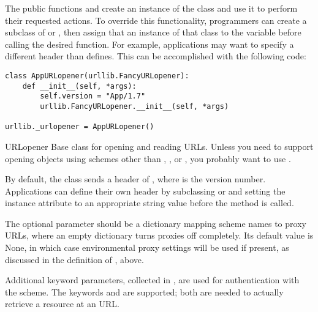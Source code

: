 The public functions  and
 create an instance of the
 class and use it to perform their requested
actions.  To override this functionality, programmers can create a
subclass of  or , then assign
that an instance of that class to the
 variable before calling the desired function.
For example, applications may want to specify a different
 header than  defines.  This
can be accomplished with the following code:

\begin{verbatim}
class AppURLopener(urllib.FancyURLopener):
    def __init__(self, *args):
        self.version = "App/1.7"
        urllib.FancyURLopener.__init__(self, *args)

urllib._urlopener = AppURLopener()
\end{verbatim}

\begin{classdesc}{URLopener}{}
Base class for opening and reading URLs.  Unless you need to support
opening objects using schemes other than , ,
 or , you probably want to use
.

By default, the  class sends a
 header of , where
 is the  version number.  Applications can
define their own  header by subclassing
 or  and setting the instance
attribute  to an appropriate string value before the
 method is called.

The optional  parameter should be a dictionary mapping
scheme names to proxy URLs, where an empty dictionary turns proxies
off completely.  Its default value is None, in which case
environmental proxy settings will be used if present, as discussed in
the definition of , above.

Additional keyword parameters, collected in , are used for
authentication with the  scheme.  The keywords
 and  are supported; both are needed to
actually retrieve a resource at an  URL.
\end{classdesc}

